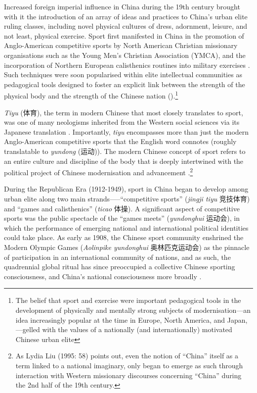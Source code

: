 \begin{CJK}{UTF8}{gbsn}
 Increased foreign imperial influence in China during the 19th century brought with it the introduction of an array of ideas and practices to China's urban elite ruling classes, including novel physical cultures of dress, adornment, leisure, and not least, physical exercise.  Sport first manifested in China in the promotion of Anglo-American competitive sports by North American Christian missionary organisations such as the Young Men's Christian Association (YMCA), and the incorporation of Northern European calisthenics routines into military exercises \citep[240]{Morris2004}.  Such techniques were soon popularised within elite intellectual communities as pedagogical tools designed to foster an explicit link between the strength of the physical body and the strength of the Chinese nation (\cites[32]{Morris2004}[49]{Brownell1995}).\footnote{The belief that sport and exercise were important pedagogical tools in the development of physically and mentally strong subjects of modernisation---an idea increasingly popular at the time in Europe, North America, and Japan, \citep{Elias1986}---gelled with the values of a nationally (and internationally) motivated Chinese urban elite}

 \textit{Tiyu} (体育), the term in modern Chinese that most closely translates to sport, was one of many neologisms inherited from the Western social sciences via its Japanese translation \citep{Morris1998}.  Importantly, \textit{tiyu} encompasses more than just the modern Anglo-American competitive sports that the English word connotes (roughly translatable to \textit{yundong} (运动)).  The modern Chinese concept of sport refers to an entire culture and discipline of the body that is deeply intertwined with the political project of Chinese modernisation and advancement \citep{Morris2004}.\footnote{As Lydia Liu (1995: 58) points out, even the notion of ``China'' itself as a term linked to a national imaginary, only began to emerge as such through interaction with Western missionary discourses concerning ``China'' during the 2nd half of the 19th century.}

 During the Republican Era (1912-1949), sport in China began to develop among urban elite along two main strands—--``competitive sports'' (\textit{jingji tiyu} 竞技体育) and ``games and calisthenics'' (\textit{ticao} 体操).  A significant aspect of competitive sports was the public spectacle of the ``games meets'' (\textit{yundonghui} 运动会), in which the performance of emerging national and international political identities could take place.  As early as 1908, the Chinese sport community enshrined the Modern Olympic Games (\textit{Aolinpike yundonghui} 奥林匹克运动会) as the pinnacle of participation in an international community of nations, and as such, the quadrennial global ritual has since preoccupied a collective Chinese sporting consciousness, and China's national consciousness more broadly \citep{Jarvie2008,Barme2009,Brownell2008,Morris2004}.


\end{CJK}
